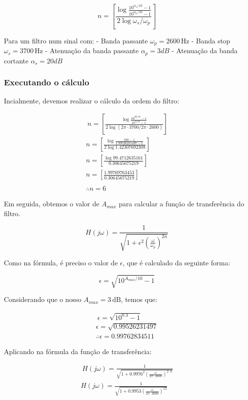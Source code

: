 
$$
    n = \left[ \frac{\log{\frac{10^{\alpha_s/10}- 1}{10^{\alpha_p/10}-1}}}{2\log{\omega_s/\omega_p}} \right]
$$

Para um filtro num sinal com:
- Banda passante $\omega_p=2600 \, \text{Hz}$
- Banda stop $\omega_s = 3700\, \text{Hz}$
- Atenuação da banda passante $\alpha_p = 3dB$
- Atenuação da banda cortante $\alpha_s = 20dB$


\subsubsection{Executando o cálculo}
Incialmente, devemos realizar o cálculo da ordem do filtro:

\begin{align} \
    n = \left[ \frac{\log{\frac{10^{20/10}- 1}{10^{3/10}-1}}}{2\log{(2\pi \cdot3700/2\pi\cdot 2600)}} \right] \\
    n = \left[ \frac{\log{\frac{100- 1}{1.99526231497-1}}}{2\log{1.42307692308}} \right]                      \\
    n = \left[ \frac{\log{99.4712635161}}{0.30645675219} \right]                                              \\
    n = \left[ \frac{1.99769763453}{0.30645675219} \right]                                                    \\
    \\
    \therefore n = 6
\end{align}


Em seguida, obtemos o valor de $A_{max}$ para calcular a função de transferência do filtro.

$$
    H(j\omega) = \frac{1}{\sqrt{1+\epsilon^2 \left( \frac{\omega}{\omega_p} \right)^{2n}}}
$$

Como na fórmula, é preciso o valor de $\epsilon$, que é calculado da seguinte forma:

$$
    \epsilon = \sqrt{10^{A_{max}/10}-1}
$$

Considerando que o nosso $A_{max}=3\, \text{dB}$, temos que:

\begin{align} \
    \epsilon = \sqrt{10^{0.3}-1}    \\
    \epsilon = \sqrt{0.99526231497} \\
    \therefore \epsilon = 0.99762834511
\end{align}

Aplicando na fórmula da função de transferência:

\begin{align} \
    H(j\omega) = \frac{1}{\sqrt{1+0.9976^2 \left( \frac{\omega}{2\pi \cdot 2600} \right)^{2\cdot 6}}} \\
    H(j\omega) = \frac{1}{\sqrt{1+0.9953 \left( \frac{\omega}{2\pi \cdot 2600} \right)^{12}}}
\end{align} \\
